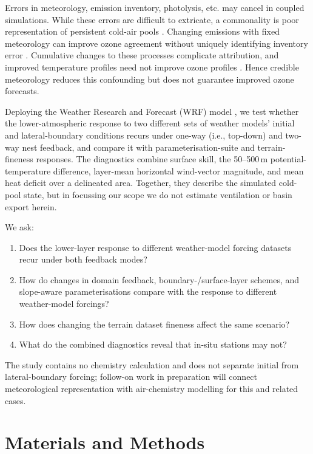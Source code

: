 \documentclass[air,article,submit,moreauthors]{Definitions/mdpi}
\begin{document}
Errors in meteorology, emission inventory, photolysis, etc. may cancel in coupled simulations.
While these errors are difficult to extricate, a commonality is poor representation of persistent cold-air pools \citep{Tran2018-cx,Neemann2015-ws}.
Changing emissions with fixed meteorology can improve ozone agreement without uniquely identifying inventory error \citep{Ahmadov2015-zm}.
Cumulative changes to these processes complicate attribution, and improved temperature profiles need not improve ozone profiles \citep{Matichuk2017-bq}.
Hence credible meteorology reduces this confounding but does not guarantee improved ozone forecasts.

Deploying the Weather Research and Forecast (WRF) model \citep{Skamarock2019-dk}, we test whether the lower-atmospheric response to two different sets of weather models' initial and lateral-boundary conditions recurs under one-way (i.e., top-down) and two-way nest feedback, and compare it with parameterisation-suite and terrain-fineness responses.
The diagnostics combine surface skill, the 50--500\,m potential-temperature difference, layer-mean horizontal wind-vector magnitude, and mean heat deficit over a delineated area.
Together, they describe the simulated cold-pool state, but in focussing our scope we do not estimate ventilation or basin export herein.

We ask:

\begin{enumerate}
  \item Does the lower-layer response to different weather-model forcing datasets recur under both feedback modes?
  \item How do changes in domain feedback, boundary-/surface-layer schemes, and slope-aware parameterisations compare with the response to different weather-model forcings?
  \item How does changing the terrain dataset fineness affect the same scenario?
  \item What do the combined diagnostics reveal that in-situ stations may not?
\end{enumerate}

The study contains no chemistry calculation and does not separate initial from lateral-boundary forcing; follow-on work in preparation will connect meteorological representation with air-chemistry modelling for this and related cases.

\section{Materials and Methods}
\label{sec:v3-methods}
\end{document}
